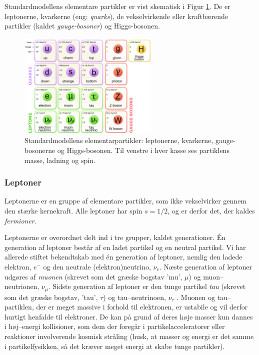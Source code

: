 Standardmodellens elementare partikler er vist skematisk i Figur
\ref{fig:standard}. De er leptonerne, kvarkerne (eng: \emph{quarks}),
de vekselvirkende eller kraftbærende partikler (kaldet
\emph{gauge-bosoner}) og Higgs-bosonen.
\begin{figure}[h!]
  \centering
  \includegraphics[width=0.6\textwidth]{KernePartikel/fig_p/standard.png}
  \caption{ Standardmodellens elementarpartikler: leptonerne,
      kvarkerne, gauge-bosonerne og Higgs-bosonen. Til venstre i hver
      kasse ses partiklens masse, ladning og spin.}
  \label{fig:standard}
\end{figure}

\subsubsection{Leptoner}
Leptonerne er en gruppe af elementare partikler, som ikke vekselvirker
gennem den stærke kernekraft. Alle leptoner har spin $s = 1/2$, og er
derfor det, der kaldes \emph{fermioner}.

Leptonerne er overordnet delt ind i tre grupper, kaldet
generationer. Én generation af leptoner består af en ladet partikel og
en neutral partikel. Vi har allerede stiftet bekendtskab med én
generation af leptoner, nemlig den ladede elektron, $e^-$ og den
neutrale (elektron)neutrino, $\nu_e$. Næste generation af leptoner
udgøres af \emph{muonen} (skrevet som det græske bogstav 'mu', $\mu$)
og muon--neutrionen, $\nu_\mu$. Sidste generation af leptoner er den
tunge partikel \emph{tau} (skrevet som det græske bogstav, 'tau',
$\tau$) og tau--neutrinoen, $\nu_\tau$ . Muonen og tau--partiklen, der er
meget massive i forhold til elektronen, er ustabile og vil derfor
hurtigt henfalde til elektroner. De kan på grund af deres høje masser
kun dannes i høj--energi kollisioner, som dem der foregår i
partikelacceleratorer eller reaktioner involverende kosmisk stråling
(husk, at masser og energi er det samme i partikelfysikken, så det
kræver meget energi at skabe tunge partikler).

